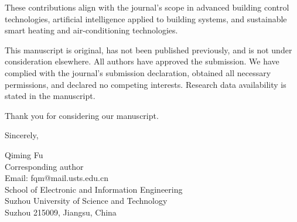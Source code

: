 \documentclass[11pt]{article}
\begin{document}
These contributions align with the journal's scope in advanced building control technologies, artificial intelligence applied to building systems, and sustainable smart heating and air-conditioning technologies.

This manuscript is original, has not been published previously, and is not under consideration elsewhere. All authors have approved the submission. We have complied with the journal's submission declaration, obtained all necessary permissions, and declared no competing interests. Research data availability is stated in the manuscript.

Thank you for considering our manuscript.

\vspace{0.55\baselineskip}

Sincerely,

\vspace{0.45\baselineskip}

Qiming Fu\\
Corresponding author\\
Email: fqm@mail.usts.edu.cn\\
School of Electronic and Information Engineering\\
Suzhou University of Science and Technology\\
Suzhou 215009, Jiangsu, China
\end{document}

